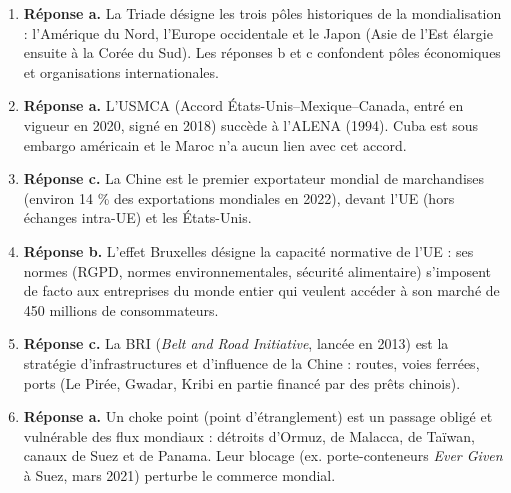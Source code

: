 \documentclass[11pt]{article}
\newcommand{\cle}[1]{{\popxbold\color{popdark}#1}}
\begin{document}
\begin{corrige}
\begin{enumerate}
\item \textbf{Réponse a.} La \cle{Triade} désigne les trois pôles historiques de la mondialisation : l'Amérique du Nord, l'Europe occidentale et le Japon (Asie de l'Est élargie ensuite à la Corée du Sud). Les réponses b et c confondent pôles économiques et organisations internationales.
\item \textbf{Réponse a.} L'\cle{USMCA} (Accord États-Unis--Mexique--Canada, entré en vigueur en 2020, signé en 2018) succède à l'ALENA (1994). Cuba est sous embargo américain et le Maroc n'a aucun lien avec cet accord.
\item \textbf{Réponse c.} La \cle{Chine} est le premier exportateur mondial de marchandises (environ 14 \% des exportations mondiales en 2022), devant l'UE (hors échanges intra-UE) et les États-Unis.
\item \textbf{Réponse b.} L'\cle{effet Bruxelles} désigne la capacité normative de l'UE : ses normes (RGPD, normes environnementales, sécurité alimentaire) s'imposent de facto aux entreprises du monde entier qui veulent accéder à son marché de 450 millions de consommateurs.
\item \textbf{Réponse c.} La \cle{BRI} (\emph{Belt and Road Initiative}, lancée en 2013) est la stratégie d'infrastructures et d'influence de la Chine : routes, voies ferrées, ports (Le Pirée, Gwadar, Kribi en partie financé par des prêts chinois).
\item \textbf{Réponse a.} Un \cle{choke point} (point d'étranglement) est un passage obligé et vulnérable des flux mondiaux : détroits d'Ormuz, de Malacca, de Taïwan, canaux de Suez et de Panama. Leur blocage (ex. porte-conteneurs \emph{Ever Given} à Suez, mars 2021) perturbe le commerce mondial.
\end{enumerate}
\end{corrige}
\end{document}
